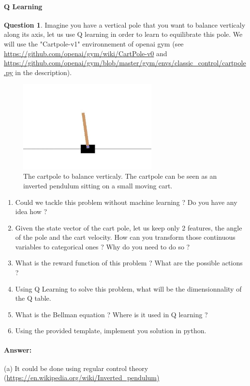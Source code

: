 \documentclass[11pt,a4paper]{article}
\theoremstyle{definition}%
\newtheorem{Q}{Question}[] %
\newcommand{\reponse}[1]{%
\ifthenelse {\boolean{corrige}} {\paragraph{Answer:} \color{darkblue}   #1\color{black}} {}
}
\begin{document}
\paragraph{Q Learning}
\begin{Q}
Imagine you have a vertical pole that you want to balance verticaly along its axis,
let us use Q learning in order to learn to equilibrate this pole. We will use the "Cartpole-v1"
environnement of openai gym (see \url{https://github.com/openai/gym/wiki/CartPole-v0} and
\url{https://github.com/openai/gym/blob/master/gym/envs/classic_control/cartpole.py} in the description).

\begin{figure}[h]
    \centering
\includegraphics[width=7cm]{cartpole.jpg}
    \caption{The cartpole to balance verticaly. The cartpole can be seen as an inverted pendulum
    sitting on a small moving cart.}
\end{figure}

\begin{enumerate}
    \item Could we tackle this problem without machine learning ? Do you have any idea how ?
    \item Given the state vector of the cart pole, let us keep only 2 features, the angle of the
        pole and the cart velocity. How can you transform those continuous variables to
        categorical ones ? Why do you need to do so ?
    \item What is the reward function of this problem ? What are the possible actions ?
    \item Using Q Learning to solve this problem, what will be the dimensionnality of the Q table.
    \item What is the Bellman equation ? Where is it used in Q learning ?
    \item Using the provided template, implement you solution in python. 

\end{enumerate}

\reponse{
    (a) It could be done using regular control theory (\url{https://en.wikipedia.org/wiki/Inverted_pendulum)}\\

}
\end{Q}
\end{document}
